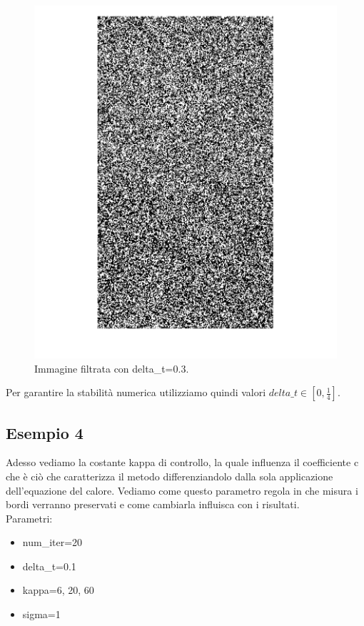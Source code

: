 \begin{figure}[htb] \centering
\includegraphics[scale=0.15]{Pictures/Esempi di utilizzo/Esempio 3/SfondoForesta_filtrata_deltat0_3.png}
\caption{Immagine filtrata con delta\_t=0.3.}\label{fig:figura}
\end{figure}
Per garantire la stabilità numerica utilizziamo quindi valori $delta\_t \in [0,\frac{1}{4}]$.

\newpage
\subsection{Esempio 4}
Adesso vediamo la costante kappa di controllo, la quale influenza il coefficiente c che è ciò che caratterizza il metodo differenziandolo dalla sola applicazione dell'equazione del calore. Vediamo come questo parametro regola in che misura i bordi verranno preservati e come cambiarla influisca con i risultati.\\
Parametri:
\begin{itemize}
    \item num\_iter=20
    \item delta\_t=0.1
    \item kappa=6, 20, 60
    \item sigma=1
\end{itemize}

